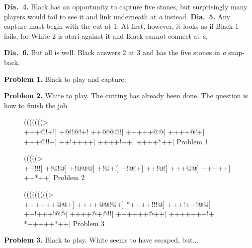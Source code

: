 \documentclass[mcrownvopaper,10pt,twopage,onecolumn,final]{memoir}
\begin{document}
\noindent
\textbf{Dia.\ 4.} Black has an opportunity to capture five stones, but surprisingly
many players would fail to see it and link underneath at \textit{a} instead.
\noindent
\textbf{Dia.\ 5.} Any capture must begin with the cut at 1. At first, however, it
looks as if Black 1 fails, for White 2 is atari against it and Black cannot
connect at \textit{a}.

\noindent
\textbf{Dia.\ 6.} But all is well. Black answers 2 at 3 and has the five stones in \textit{a}
snap-back.

\noindent
\textbf{Problem 1.} Black to play and capture.

\noindent
\textbf{Problem 2.} White to play. The cutting has already been done. The
question is how to finish the job.

\begin{figure}[ht]
    \begin{minipage}[c]{0.32\linewidth}
        \centering    
        {\gnos%
        (((((((>\\
        +++@!+!]
        +@!!@!+!
        ++@!@@!]
        +++++@@]
        ++++@!+]
        +++@!!+]
        ++!++++]
        ++++!++]
        ++++*++]
        }
        Problem 1
    \end{minipage}%
    \begin{minipage}[c]{0.27\linewidth}
        \centering    
        {\gnos%
        (((((>\\
        ++!!!]
        +!@!@]
        +!@@@]
        +!@+!]
        +!@!+]
        ++!@!]
        +++@@]
        +++++]
        ++*++]
        }
        Problem 2
    \end{minipage}%
    \begin{minipage}[c]{0.41\linewidth}
        \centering    
        {\gnos%
        (((((((((>\\
        ++++++@@+]
        ++++@@!@+]
        *++++!!!@]
        +++!++!@@]
        ++!+++!@@]
        ++++@+@!!]
        ++++++@++]
        +++++++!+]
        *+++++*++]
        }
        Problem 3
    \end{minipage}
\end{figure}

\noindent
\textbf{Problem 3.} Black to play. White seems to have escaped, but...
\end{document}
